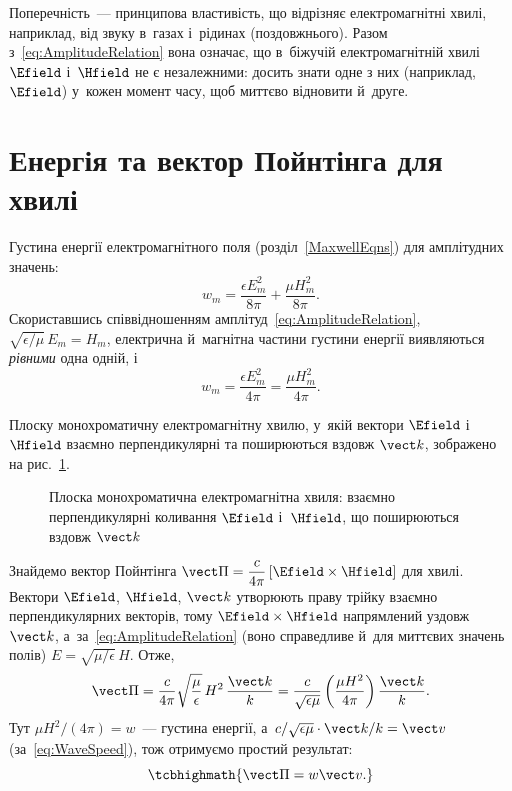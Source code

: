 Поперечність~--- принципова властивість, що відрізняє електромагнітні хвилі, наприклад, від звуку в~газах і~рідинах (поздовжнього). Разом
з~\eqref{eq:AmplitudeRelation} вона означає, що в~біжучій електромагнітній хвилі $\Efield$ і~$\Hfield$ не є незалежними: досить знати одне з
них (наприклад, $\Efield$) у~кожен момент часу, щоб миттєво відновити й~друге.

\section{Енергія та вектор Пойнтінга для хвилі}\hypertarget{poynting-vector-energy}{}

Густина енергії електромагнітного поля (розділ~\ref{MaxwellEqns}) для амплітудних значень:
\begin{equation}\label{eq:EnergyDensityAmplitude}
	w_m = \frac{\epsilon E_m^2}{8\pi}+\frac{\mu H_m^2}{8\pi}.
\end{equation}
Скориставшись співвідношенням амплітуд~\eqref{eq:AmplitudeRelation}, $\sqrt{\epsilon/\mu}\,E_m = H_m$, електрична й~магнітна частини густини
енергії виявляються \emph{рівними} одна одній, і
\begin{equation*}
	w_m = \frac{\epsilon E_m^2}{4\pi} = \frac{\mu H_m^2}{4\pi}.
\end{equation*}

Плоску монохроматичну електромагнітну хвилю, у~якій вектори $\Efield$ і~$\Hfield$ взаємно перпендикулярні та поширюються вздовж $\vect k$,
зображено на рис.~\ref{pic:EMWave}.

\begin{figure}[h!]\centering
	\caption{Плоска монохроматична електромагнітна хвиля: взаємно перпендикулярні коливання
		$\Efield$ і~$\Hfield$, що поширюються вздовж $\vect k$}
	\label{pic:EMWave}
\end{figure}

Знайдемо вектор Пойнтінга $\vect\Pi = \dfrac{c}{4\pi}\left[\Efield\times\Hfield\right]$ для хвилі. Вектори $\Efield$, $\Hfield$, $\vect k$ утворюють праву трійку
взаємно перпендикулярних векторів, тому $\Efield\times\Hfield$ напрямлений уздовж $\vect k$, а~за~\eqref{eq:AmplitudeRelation} (воно справедливе й~для миттєвих
значень полів) $E=\sqrt{\mu/\epsilon}\,H$. Отже,
\begin{equation}\label{eq:PoyntingWaveDerivation}
	\vect\Pi = \frac{c}{4\pi}\sqrt{\frac\mu\epsilon}\,H^2\,\frac{\vect k}{k} = \frac{c}{\sqrt{\epsilon\mu}}\left(\frac{\mu H^2}{4\pi}\right)\frac{\vect k}{k}.
\end{equation}
Тут $\mu H^2/(4\pi) = w$~--- густина енергії, а~$c/\sqrt{\epsilon\mu}\cdot\vect k/k = \vect v$ (за~\eqref{eq:WaveSpeed}), тож
отримуємо простий результат:
\begin{equation}\label{eq:PoyntingWaveResult}
	\tcbhighmath{
		\vect\Pi = w\vect v.
	}
\end{equation}

